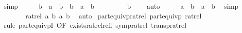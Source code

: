 \begin{isabellebody}
\ simp\isanewline
\ \ \isamarkupfalse%
\ \isamarkupfalse%
\ {\isachardoublequoteopen}b{\isacharprime}{\kern0pt}\ {\isacharasterisk}{\kern0pt}\ {\isacharparenleft}{\kern0pt}a\ {\isacharasterisk}{\kern0pt}\ b{\isacharprime}{\kern0pt}{\isacharprime}{\kern0pt}{\isacharparenright}{\kern0pt}\ {\isacharequal}{\kern0pt}\ b{\isacharprime}{\kern0pt}\ {\isacharasterisk}{\kern0pt}\ {\isacharparenleft}{\kern0pt}a{\isacharprime}{\kern0pt}{\isacharprime}{\kern0pt}\ {\isacharasterisk}{\kern0pt}\ b{\isacharparenright}{\kern0pt}{\isachardoublequoteclose}\ \isacommand{{\isachardot}{\kern0pt}}\isamarkupfalse%
\isanewline
\ \ \isamarkupfalse%
\ \isamarkupfalse%
\ {\isacharasterisk}{\kern0pt}{\isacharasterisk}{\kern0pt}\ \isamarkupfalse%
\ {\isachardoublequoteopen}b{\isacharprime}{\kern0pt}\ {\isasymnoteq}\ {}{\isachardoublequoteclose}\ \isamarkupfalse%
\ auto\isanewline
\ \ \isamarkupfalse%
\ \isamarkupfalse%
\ {\isachardoublequoteopen}a\ {\isacharasterisk}{\kern0pt}\ b{\isacharprime}{\kern0pt}{\isacharprime}{\kern0pt}\ {\isacharequal}{\kern0pt}\ a{\isacharprime}{\kern0pt}{\isacharprime}{\kern0pt}\ {\isacharasterisk}{\kern0pt}\ b{\isachardoublequoteclose}\ \isamarkupfalse%
\ simp\isanewline
\ \ \isamarkupfalse%
\ {\isacharasterisk}{\kern0pt}\ {\isacharasterisk}{\kern0pt}{\isacharasterisk}{\kern0pt}\ \isamarkupfalse%
\ {\isachardoublequoteopen}ratrel\ {\isacharparenleft}{\kern0pt}a{\isacharcomma}{\kern0pt}\ b{\isacharparenright}{\kern0pt}\ {\isacharparenleft}{\kern0pt}a{\isacharprime}{\kern0pt}{\isacharprime}{\kern0pt}{\isacharcomma}{\kern0pt}\ b{\isacharprime}{\kern0pt}{\isacharprime}{\kern0pt}{\isacharparenright}{\kern0pt}{\isachardoublequoteclose}\ \isamarkupfalse%
\ auto\isanewline
{}\isamarkupfalse%
%
\endisatagproof
{\isafoldproof}%
%
\isadelimproof
\isanewline
%
\endisadelimproof
\isanewline
{}\isamarkupfalse%
\ part{\isacharunderscore}{\kern0pt}equivp{\isacharunderscore}{\kern0pt}ratrel{\isacharcolon}{\kern0pt}\ {\isachardoublequoteopen}part{\isacharunderscore}{\kern0pt}equivp\ ratrel{\isachardoublequoteclose}\isanewline
%
\isadelimproof
\ \ %
\endisadelimproof
%
\isatagproof
{}\isamarkupfalse%
\ {\isacharparenleft}{\kern0pt}rule\ part{\isacharunderscore}{\kern0pt}equivpI\ {\isacharbrackleft}{\kern0pt}OF\ exists{\isacharunderscore}{\kern0pt}ratrel{\isacharunderscore}{\kern0pt}refl\ symp{\isacharunderscore}{\kern0pt}ratrel\ transp{\isacharunderscore}{\kern0pt}ratrel{\isacharbrackright}{\kern0pt}{\isacharparenright}{\kern0pt}%

\end{isabellebody}
